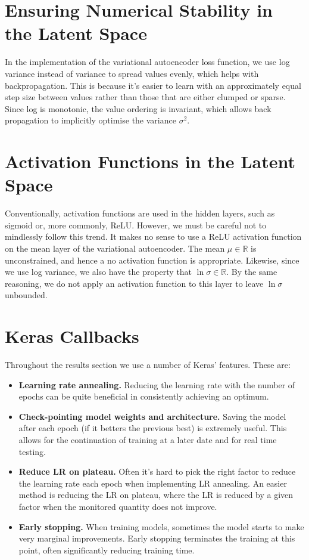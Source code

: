 %
%
%
%
%
\section{Ensuring Numerical Stability in the Latent Space}
In the implementation of the variational autoencoder loss function, we use log variance instead of variance to spread values evenly, which helps with backpropagation. This is because it's easier to learn with an approximately equal step size between values rather than those that are either clumped or sparse. Since log is monotonic, the value ordering is invariant, which allows back propagation to implicitly optimise the variance $\sigma^2$.


%
%
%
%
%
\section{Activation Functions in the Latent Space}
Conventionally, activation functions are used in the hidden layers, such as sigmoid or, more commonly, ReLU. However, we must be careful not to mindlessly follow this trend. It makes no sense to use a ReLU activation function on the mean layer of the variational autoencoder. The mean $\mu \in \mathbb{R}$ is unconstrained, and hence a no activation function is appropriate. Likewise, since we use log variance, we also have the property that $\ln \sigma \in \mathbb{R}$. By the same reasoning, we do not apply an activation function to this layer to leave $\ln\sigma$ unbounded.


%
%
%
%
%
\section{Keras Callbacks}
Throughout the results section we use a number of Keras' features. These are:
\begin{itemize}
\item \textbf{Learning rate annealing.} Reducing the learning rate with the number of epochs can be quite beneficial in consistently achieving an optimum.
\item \textbf{Check-pointing model weights and architecture.} Saving the model after each epoch (if it betters the previous best) is extremely useful. This allows for the continuation of training at a later date and for real time testing.
\item \textbf{Reduce LR on plateau.} Often it's hard to pick the right factor to reduce the learning rate each epoch when implementing LR annealing. An easier method is reducing the LR on plateau, where the LR is reduced by a given factor when the monitored quantity does not improve.
\item \textbf{Early stopping.} When training models, sometimes the model starts to make very marginal improvements. Early stopping terminates the training at this point, often significantly reducing training time.
\end{itemize}